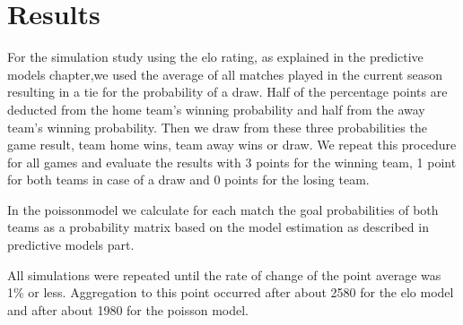 \documentclass[12pt,a4paper]{article}
\begin{document}
\hypertarget{results}{%
\section{Results}\label{results}}

For the simulation study using the elo rating, as explained in the
predictive models chapter,we used the average of all matches played in
the current season resulting in a tie for the probability of a draw.
Half of the percentage points are deducted from the home team's winning
probability and half from the away team's winning probability. Then we
draw from these three probabilities the game result, team home wins,
team away wins or draw. We repeat this procedure for all games and
evaluate the results with 3 points for the winning team, 1 point for
both teams in case of a draw and 0 points for the losing team.

In the poissonmodel we calculate for each match the goal probabilities
of both teams as a probability matrix based on the model estimation as
described in predictive models part.

All simulations were repeated until the rate of change of the point
average was 1\% or less. Aggregation to this point occurred after about
2580 for the elo model and after about 1980 for the poisson model.
\end{document}
